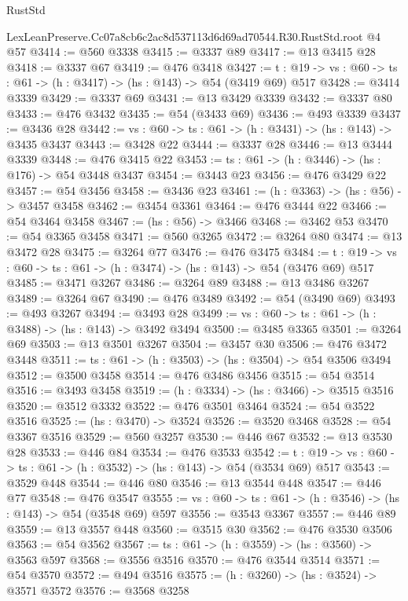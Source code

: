 \begin{lexlean}{RustStd}
\begin{coremodule}
  LexLeanPreserve.Cc07a8cb6c2ac8d537113d6d69ad70544.R30.RustStd.root @4 @57
@3414 := @560 @3338
@3415 := @3337 @89
@3417 := @13 @3415 @28
@3418 := @3337 @67
@3419 := @476 @3418
@3427 := {t : @19} -> {vs : @60} -> {ts : @61} -> (h : @3417) -> (hs : @143) -> @54 (@3419 @69) @517
@3428 := @3414 @3339
@3429 := @3337 @69
@3431 := @13 @3429 @3339
@3432 := @3337 @80
@3433 := @476 @3432
@3435 := @54 (@3433 @69)
@3436 := @493 @3339
@3437 := @3436 @28
@3442 := {vs : @60} -> {ts : @61} -> (h : @3431) -> (hs : @143) -> @3435 @3437
@3443 := @3428 @22
@3444 := @3337 @28
@3446 := @13 @3444 @3339
@3448 := @476 @3415 @22
@3453 := {ts : @61} -> (h : @3446) -> (hs : @176) -> @54 @3448 @3437
@3454 := @3443 @23
@3456 := @476 @3429 @22
@3457 := @54 @3456
@3458 := @3436 @23
@3461 := (h : @3363) -> (hs : @56) -> @3457 @3458
@3462 := @3454 @3361
@3464 := @476 @3444 @22
@3466 := @54 @3464 @3458
@3467 := (hs : @56) -> @3466
@3468 := @3462 @53
@3470 := @54 @3365 @3458
@3471 := @560 @3265
@3472 := @3264 @80
@3474 := @13 @3472 @28
@3475 := @3264 @77
@3476 := @476 @3475
@3484 := {t : @19} -> {vs : @60} -> {ts : @61} -> (h : @3474) -> (hs : @143) -> @54 (@3476 @69) @517
@3485 := @3471 @3267
@3486 := @3264 @89
@3488 := @13 @3486 @3267
@3489 := @3264 @67
@3490 := @476 @3489
@3492 := @54 (@3490 @69)
@3493 := @493 @3267
@3494 := @3493 @28
@3499 := {vs : @60} -> {ts : @61} -> (h : @3488) -> (hs : @143) -> @3492 @3494
@3500 := @3485 @3365
@3501 := @3264 @69
@3503 := @13 @3501 @3267
@3504 := @3457 @30
@3506 := @476 @3472 @3448
@3511 := {ts : @61} -> (h : @3503) -> (hs : @3504) -> @54 @3506 @3494
@3512 := @3500 @3458
@3514 := @476 @3486 @3456
@3515 := @54 @3514
@3516 := @3493 @3458
@3519 := (h : @3334) -> (hs : @3466) -> @3515 @3516
@3520 := @3512 @3332
@3522 := @476 @3501 @3464
@3524 := @54 @3522 @3516
@3525 := (hs : @3470) -> @3524
@3526 := @3520 @3468
@3528 := @54 @3367 @3516
@3529 := @560 @3257
@3530 := @446 @67
@3532 := @13 @3530 @28
@3533 := @446 @84
@3534 := @476 @3533
@3542 := {t : @19} -> {vs : @60} -> {ts : @61} -> (h : @3532) -> (hs : @143) -> @54 (@3534 @69) @517
@3543 := @3529 @448
@3544 := @446 @80
@3546 := @13 @3544 @448
@3547 := @446 @77
@3548 := @476 @3547
@3555 := {vs : @60} -> {ts : @61} -> (h : @3546) -> (hs : @143) -> @54 (@3548 @69) @597
@3556 := @3543 @3367
@3557 := @446 @89
@3559 := @13 @3557 @448
@3560 := @3515 @30
@3562 := @476 @3530 @3506
@3563 := @54 @3562
@3567 := {ts : @61} -> (h : @3559) -> (hs : @3560) -> @3563 @597
@3568 := @3556 @3516
@3570 := @476 @3544 @3514
@3571 := @54 @3570
@3572 := @494 @3516
@3575 := (h : @3260) -> (hs : @3524) -> @3571 @3572
@3576 := @3568 @3258

\end{coremodule}
\end{lexlean}
